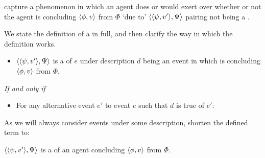 \begin{note}
   capture a phenomenon in which an agent does or would exert \ninf{} over whether or not the agent is concluding \(\langle \phi, v \rangle\) from \(\Phi\) `due to' \(\langle \langle \psi, v' \rangle, \Psi \rangle\) pairing not being a \fc{}.

  We state the definition of a \requ{} in full, and then clarify the way in which the definition works.

  \begin{definition}[A \requ{0}]
    \label{def:requ}


    \begin{itemize}
    \item
      \(\langle \langle \psi, v' \rangle, \Psi \rangle\) is a \emph{\requ{}} of \(e\) under description \(d\) being an event in which \vAgent{} is concluding \(\langle \phi, v \rangle\) from \(\Phi\).
    \end{itemize}

    \emph{If and only if}

    \begin{itemize}
    \item
      For any alternative event \(e'\) to event \(e\) such that \(d\) is true of \(e'\):
    \end{itemize}
    \vspace{-\baselineskip}
  \end{definition}

  \noindent%
  As we will always consider events under some description, shorten the defined term to:
  \begin{notation}
  \item
    \(\langle \langle \psi, v' \rangle, \Psi \rangle\) is a \requ{} of an agent concluding \(\langle \phi, v \rangle\) from \(\Phi\).
  \end{notation}
\end{note}

